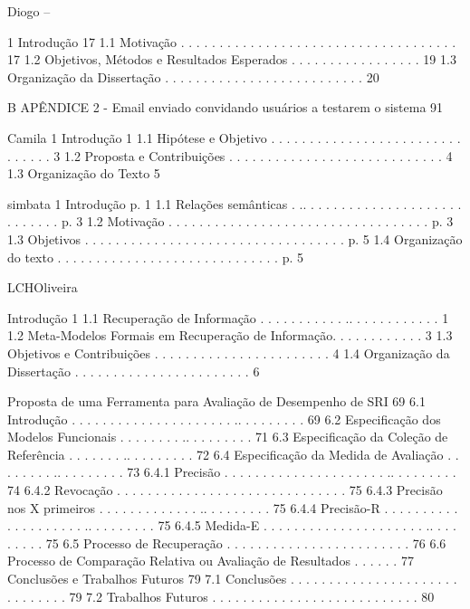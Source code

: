 Diogo --

1 Introdução
17
1.1 Motivação . . . . . . . . . . . . . . . . . . . . . . . . . . . . . . . . . . . . 17
1.2 Objetivos, Métodos e Resultados Esperados . . . . . . . . . . . . . . . . . 19
1.3 Organização da Dissertação . . . . . . . . . . . . . . . . . . . . . . . . . . 20

B APÊNDICE 2 - Email enviado convidando usuários a testarem o sistema 91



Camila
1 Introdução
1
1.1 Hipótese e Objetivo . . . . . . . . . . . . . . . . . . . . . . . . . . . . . . . 3
1.2 Proposta e Contribuições . . . . . . . . . . . . . . . . . . . . . . . . . . . . 4
1.3 Organização do Texto 5


simbata
1
Introdução p. 1
1.1 Relações semânticas . .. . . . . . . . . . . . . . . . . . . . . . . . . . . . p. 3
1.2 Motivação . . . . . . .  . . . . . . . . . . . . . . . . . . . . . . . . . . . p. 3
1.3 Objetivos . . . . . . .  . . . . . . . . . . . . . . . . . . . . . . . . . . . p. 5
1.4 Organização do texto . . . . . . . . . . . . . . . . . . . . . . . . . . . . . p. 5





LCHOliveira

Introdução 1
1.1 Recuperação de Informação . . . . . . . . . . . .. . . . . . . . . . . . 1
1.2 Meta-Modelos Formais em Recuperação de Informação. . . . . . . . . . . . 3
1.3 Objetivos e Contribuições  . . . . . . . . . . . . . . . . . . . . . . . 4
1.4 Organização da Dissertação . . . . . . . . . . . . . . . . . . . . . . . 6

Proposta de uma Ferramenta para Avaliação de Desempenho de SRI 69
6.1 Introdução . . . . . . . . . . . . . . . . . . . . . .. . . . . . . . . 69
6.2 Especificação dos Modelos Funcionais . . . . . . . . .. . . . . . . . . 71
6.3 Especificação da Coleção de Referência . . . . . . . .. . . . . . . . . 72
6.4 Especificação da Medida de Avaliação . . . . . . . . .. . . . . . . . . 73
6.4.1 Precisão . . . . . . . . . . . . . . . . . . . . . .. . . . . . . . . 74
6.4.2 Revocação . . . . . . . . . . . . . . . . . . . . . . . . . . . . . . 75
6.4.3 Precisão nos X primeiros . . . . . . . . . . . . . .. . . . . . . . . 75
6.4.4 Precisão-R . . . . . . . . . . . . . . . . . . . . .. . . . . . . . . 75
6.4.5 Medida-E . . . . . . . . . . . . . . . . . . . . . .. . . . . . . . . 75
6.5 Processo de Recuperação . . . . . . . . . . . . . . . . . . . . . . . . 76
6.6 Processo de Comparação Relativa ou Avaliação de Resultados  . . . . . . 77
Conclusões e Trabalhos Futuros 79
7.1 Conclusões . . . . . . . . . . . . . . . . . . . . . . . .  . . . . . . 79
7.2 Trabalhos Futuros . . . . . . . . . . . . . . . . . . . . . . . . . . . 80





